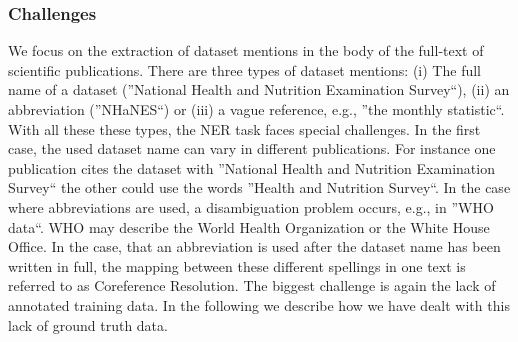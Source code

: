 \subsubsection{Challenges}
We focus on the extraction of dataset mentions in the body of the full-text of scientific publications.
There are three types of dataset mentions:
(i) The full name of a dataset (''National Health and Nutrition Examination Survey``),
(ii) an abbreviation (''NHaNES``) or (iii) a vague reference, e.g., ''the monthly statistic``.
With all these these types, the NER task faces special challenges.
In the first case, the used dataset name can vary in different publications.
For instance one publication cites the dataset with ''National Health and Nutrition Examination Survey`` the other could use the words  ''Health and Nutrition Survey``.
In the case where abbreviations are used, a disambiguation problem occurs, e.g., in ''WHO data``. WHO may describe the World Health Organization or the White House Office.
In the case, that an abbreviation is used after the dataset name has been written in full, the mapping between these different spellings in one text is referred to as Coreference Resolution.
The biggest challenge is again the lack of annotated training data.
In the following we describe how we have dealt with this lack of ground truth data.

